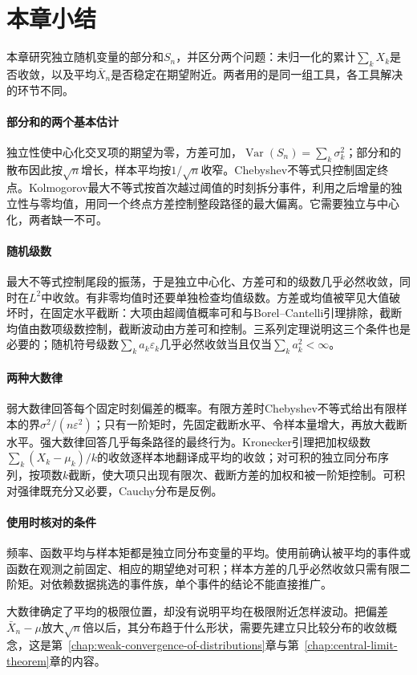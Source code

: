 \section{本章小结}
\label{sec:lln-summary}

本章研究独立随机变量的部分和$S_n$，并区分两个问题：未归一化的累计$\sum_kX_k$是否收敛，以及平均$\bar{X}_n$是否稳定在期望附近。两者用的是同一组工具，各工具解决的环节不同。

\paragraph{部分和的两个基本估计}
独立性使中心化交叉项的期望为零，方差可加，$\operatorname{Var}(S_n)=\sum_k\sigma_k^2$；部分和的散布因此按$\sqrt{n}$增长，样本平均按$1/\sqrt{n}$收窄。Chebyshev不等式只控制固定终点。Kolmogorov最大不等式按首次越过阈值的时刻拆分事件，利用之后增量的独立性与零均值，用同一个终点方差控制整段路径的最大偏离。它需要独立与中心化，两者缺一不可。

\paragraph{随机级数}
最大不等式控制尾段的振荡，于是独立中心化、方差可和的级数几乎必然收敛，同时在$L^2$中收敛。有非零均值时还要单独检查均值级数。方差或均值被罕见大值破坏时，在固定水平截断：大项由超阈值概率可和与Borel–Cantelli引理排除，截断均值由数项级数控制，截断波动由方差可和控制。三系列定理说明这三个条件也是必要的；随机符号级数$\sum_ka_k\varepsilon_k$几乎必然收敛当且仅当$\sum_ka_k^2<\infty$。

\paragraph{两种大数律}
弱大数律回答每个固定时刻偏差的概率。有限方差时Chebyshev不等式给出有限样本的界$\sigma^2/(n\varepsilon^2)$；只有一阶矩时，先固定截断水平、令样本量增大，再放大截断水平。强大数律回答几乎每条路径的最终行为。Kronecker引理把加权级数$\sum_k(X_k-\mu_k)/k$的收敛逐样本地翻译成平均的收敛；对可积的独立同分布序列，按项数$k$截断，使大项只出现有限次、截断方差的加权和被一阶矩控制。可积对强律既充分又必要，Cauchy分布是反例。

\paragraph{使用时核对的条件}
频率、函数平均与样本矩都是独立同分布变量的平均。使用前确认被平均的事件或函数在观测之前固定、相应的期望绝对可积；样本方差的几乎必然收敛只需有限二阶矩。对依赖数据挑选的事件族，单个事件的结论不能直接推广。

大数律确定了平均的极限位置，却没有说明平均在极限附近怎样波动。把偏差$\bar{X}_n-\mu$放大$\sqrt{n}$倍以后，其分布趋于什么形状，需要先建立只比较分布的收敛概念，这是第~\ref{chap:weak-convergence-of-distributions}章与第~\ref{chap:central-limit-theorem}章的内容。
